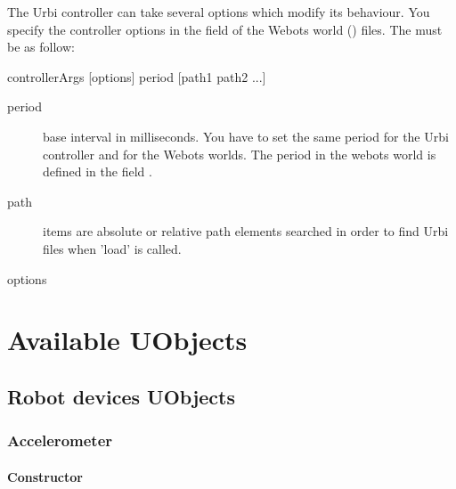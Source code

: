 The Urbi controller can take several options which modify its
behaviour.  You specify the controller options in the
 field of the Webots world () files.
The  must be as follow:

\begin{shell}
controllerArgs [options] period [path1 path2 ...]
\end{shell}

\begin{description}
\item[period] base \urbi interval in milliseconds. You have to set the
  same period for the Urbi controller and for the Webots worlds. The
  period in the webots world is defined in the field
  .

\item[path] items are absolute or relative path elements searched in
  order to find Urbi files when 'load' is called.

\item[options]
\end{description}


\section{Available UObjects}

\subsection{Robot devices UObjects}

\subsubsection{Accelerometer}

\paragraph{Constructor}

